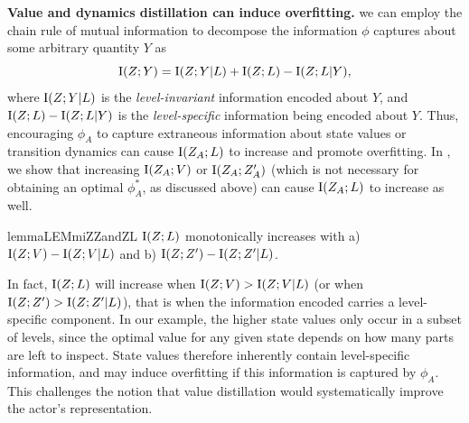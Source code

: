 \textbf{Value and dynamics distillation can induce overfitting.} we can employ the chain rule of mutual information to decompose the information $\phi$ captures about some arbitrary quantity $Y$ as
\begin{equation}
    \text{I}(Z;Y) = \text{I}(Z;Y|L) + \text{I}(Z;L) - \text{I}(Z;L|Y),
\end{equation}
where $\text{I}(Z;Y|L)$ is the \textit{level-invariant} information encoded about $Y$, and $\text{I}(Z;L) - \text{I}(Z;L|Y)$ is the \textit{level-specific} information being encoded about $Y$. Thus, encouraging $\phi_A$ to capture extraneous information about state values or transition dynamics can cause $\text{I}(Z_A;L)$ to increase and promote overfitting. In , we show that increasing $\text{I}(Z_A;V)$ or $\text{I}(Z_A;Z'_A)$ (which is not necessary for obtaining an optimal $\phi^*_A$, as discussed above) can cause $\text{I}(Z_A;L)$ to increase as well.
\begin{restatable}{lemma}{LEMmiZZandZL}\label{c2:lem:miZZ_and_ZL}
       $\text{I}(Z;L)$ monotonically increases with a) $\text{I}(Z;V)-\text{I}(Z;V|L)$ and b) $\text{I}(Z;Z')-\text{I}(Z;Z'|L)$.
\end{restatable}
In fact, $\text{I}(Z;L)$ will increase when $\text{I}(Z;V)>\text{I}(Z;V|L)$ (or when $\text{I}(Z;Z')>\text{I}(Z;Z'|L)$), that is when the information encoded carries a level-specific component. In our example, the higher state values only occur in a subset of levels, since the optimal value for any given state depends on how many parts are left to inspect. State values therefore inherently contain level-specific information, and may induce overfitting if this information is captured by $\phi_A$. This challenges the notion that value distillation would systematically improve the actor's representation. 




